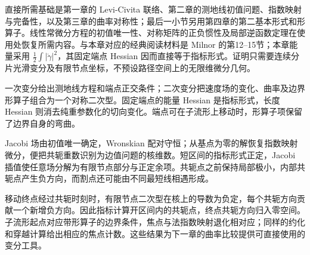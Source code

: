\ProseParagraphBreak

直接所需基础是第一章的 Levi-Civita 联络、第二章的测地线初值问题、指数映射与完备性，以及第三章的曲率对称性；最后一小节另用第四章的第二基本形式和形算子。线性常微分方程的初值唯一性、对称矩阵的正负惯性及局部逆函数定理在使用处恢复所需内容。与本章对应的经典阅读材料是 Milnor 的第12--15节\cite[第12--15节，第70--87页]{Milnor1963Morse}；本章能量采用 \(\tfrac12\int|\dot\gamma|^2\)，其固定端点 Hessian 因而直接等于指标形式。证明只需要连续分片光滑变分及有限节点坐标，不预设路径空间上的无限维微分几何。






\begin{chaptersummary}
	一次变分给出测地线方程和端点正交条件；二次变分把速度场的变化、曲率及边界形算子组合为一个对称二次型。固定端点的能量 Hessian 是指标形式，长度 Hessian 则消去纯重参数化的切向变化。端点可在子流形上移动时，形算子项保留了边界自身的弯曲。

	\ProseParagraphBreak

	Jacobi 场由初值唯一确定，Wronskian 配对守恒；从基点为零的解恢复指数映射微分，便把共轭重数识别为边值问题的核维数。短区间的指标形式正定，Jacobi 插值使任意场分解为有限节点部分与正定余项。共轭点之前保持局部极小，内部共轭点产生负方向，而割点还可能由不同最短线相遇形成。

	\ProseParagraphBreak

	移动终点经过共轭时刻时，有限节点二次型在核上的导数为负定，每个共轭方向贡献一个新增负方向。因此指标计算开区间内的共轭点，终点共轭方向归入零空间。子流形起点对应带形算子的边界条件，焦点与法指数映射退化相对应；同样的约化和穿越计算给出相应的焦点计数。这些结果为下一章的曲率比较提供可直接使用的变分工具。
\end{chaptersummary}

\BookExercises

